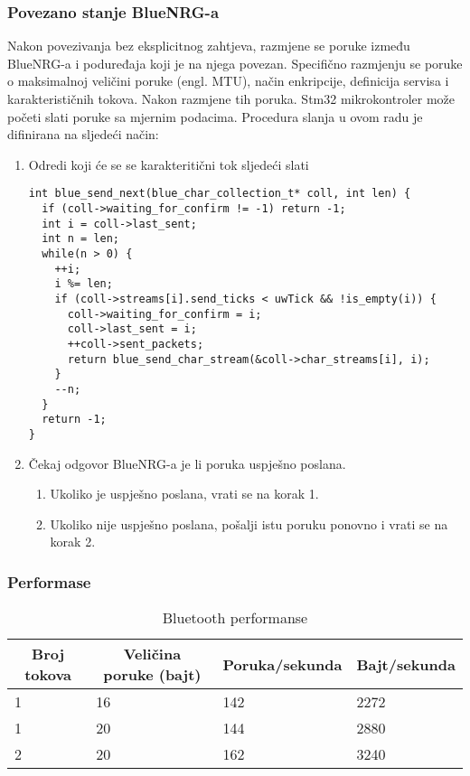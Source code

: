 \documentclass[times, utf8, diplomski]{diplomski}
\begin{document}
\subsubsection{Povezano stanje BlueNRG-a}
Nakon povezivanja bez eksplicitnog zahtjeva, razmjene se poruke između BlueNRG-a i poduređaja koji je na njega povezan. Specifično razmjenju se poruke o maksimalnoj veličini poruke (engl. MTU), način enkripcije, definicija servisa i karakterističnih tokova. Nakon razmjene tih poruka. Stm32 mikrokontroler može početi slati poruke sa mjernim podacima. Procedura slanja u ovom radu je difinirana na sljedeći način:

\begin{enumerate}
  \item Odredi koji će se se karakteritični tok sljedeći slati
\begin{lstlisting}[caption = {Procedura za odabir karakterističnog toka koji će sljedeći biti poslan}]
int blue_send_next(blue_char_collection_t* coll, int len) {
  if (coll->waiting_for_confirm != -1) return -1;
  int i = coll->last_sent;
  int n = len;
  while(n > 0) {
    ++i;
    i %= len;
    if (coll->streams[i].send_ticks < uwTick && !is_empty(i)) {
      coll->waiting_for_confirm = i;
      coll->last_sent = i;
      ++coll->sent_packets;
      return blue_send_char_stream(&coll->char_streams[i], i);
    }
    --n;
  }
  return -1;
}
\end{lstlisting}
  \item Čekaj odgovor BlueNRG-a je li poruka uspješno poslana.
    \begin{enumerate}
      \item Ukoliko je uspješno poslana, vrati se na korak 1.
      \item Ukoliko nije uspješno poslana, pošalji istu poruku ponovno i vrati se na korak 2.
    \end{enumerate}
\end{enumerate}


\subsubsection{Performase}

\begin{table}[h]
  \begin{center}
    \begin{tabular}[c]{l|l|l|l}
      \hline
      \multicolumn{1}{c|}{\textbf{Broj tokova}} &
      \multicolumn{1}{c}{\textbf{Veličina poruke (bajt)}} &
      \multicolumn{1}{c}{\textbf{Poruka/sekunda}} &
      \multicolumn{1}{c}{\textbf{Bajt/sekunda}} \\
      \hline
      1 & 16 & 142 & 2272 \\
      1 & 20 & 144 & 2880 \\
      2 & 20 & 162 & 3240 \\
      \hline
    \end{tabular}
  \caption{Bluetooth performanse}
  \end{center}
\end{table}
\end{document}
